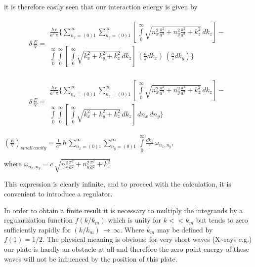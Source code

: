 \documentclass[11pt]{article}
\begin{document}
    it is therefore easily seen that our interaction energy is given by

    \[\begin{array}{lr}
\delta\,\frac{E}{V} =
\begin{array}{c}
\frac{\hbar\,c}{a^2\,\pi}\Bigg\{\sum\limits_{n_x=(0)1}^{\infty}\sum\limits_{n_y=(0)1}^{\infty}\left[\,\int\limits_{0}^{\infty}\sqrt{n_x^2\frac{\pi^2}{a^2}+n_y^2\frac{\pi^2}{a^2}+k_z^2}\,dk_z\right] - \\
\int\limits_{0}^{\infty}\int\limits_{0}^{\infty}\left[\,\int\limits_{0}^{\infty}\sqrt{k_x^2+k_y^2+k_z^2}\,dk_z\right]\,\left(\frac{a}{\pi}dk_x\right)\,\left(\frac{a}{\pi}dk_y\right)\Bigg\}
\end{array}\end{array}\]

    \[\begin{array}{lr}
\delta\,\frac{E}{V} =
\begin{array}{c}
\frac{\hbar\,c}{a^2\,\pi}\Bigg\{\sum\limits_{n_x=(0)1}^{\infty}\sum\limits_{n_y=(0)1}^{\infty}\left[\,\int\limits_{0}^{\infty}\sqrt{n_x^2\frac{\pi^2}{a^2}+n_y^2\frac{\pi^2}{a^2}+k_z^2}\,dk_z\right] - \\ \int\limits_{0}^{\infty}\int\limits_{0}^{\infty}\left[\,\int\limits_{0}^{\infty}\sqrt{k_x^2+k_y^2+k_z^2}\,dk_z\right]\,dn_x\,dn_y\Bigg\}
\end{array}\end{array}\]

    

    \({\left(\frac{E}{V}\right)_{small\,cavity} = \frac{1}{a^2}\,\hbar \, \sum\limits_{n_x=(0)1}^{\infty}\sum\limits_{n_y=(0)1}^{\infty}\,\int\limits_{0}^{\infty} {\frac {dk_{z}}{\pi}}\,\omega _{n_x,n_y},}\)

    where
\(\omega _{n_x,n_y} = c\,\sqrt{n_x^2\frac{\pi^2}{a^2}+n_y^2\frac{\pi^2}{a^2}+k_z^2}\)

    This expression is clearly infinite, and to proceed with the
calculation, it is convenient to introduce a regulator.

    In order to obtain a finite result it is necessary to multiply the
integrands by a regularization function \(f(k/k_m)\) which is unity for
\(k << k_m\) but tends to zero sufficiently rapidly for
\((k/k_m)\, \rightarrow\,\infty\). Where \(k_m\) may be defined by
\(f(1) = {1}/{2}\). The physical meaning is obvious: for very short
waves (X\textasciitilde{}rays e.g.) our plate is hardly an obstacle at
all and therefore the zero point energy of these waves will not be
influenced by the position of this plate.
\end{document}
